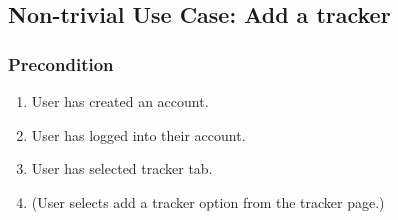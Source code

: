 \documentclass[a4paper,11pt]{article} %
\begin{document}
\subsection{Non-trivial Use Case: Add a tracker}
\subsubsection*{Precondition}
\begin{enumerate}
    \item User has created an account.
    \item User has logged into their account.
    \item User has selected tracker tab.
    \item (User selects add a tracker option from the tracker page.)
\end{enumerate}
\end{document}
